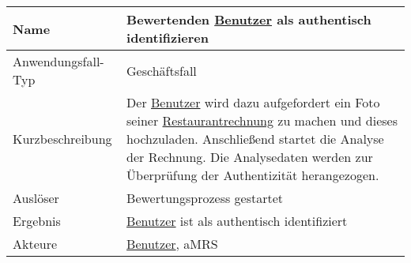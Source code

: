 \begin{table}[H]
    \centering
    \label{}
    \begin{tabularx}{\textwidth}{| l | X |}
        \hline
        Name               & Bewertenden \hyperref[gls:nutzer]{Benutzer} als authentisch identifizieren                                                                                                                                                                                                                \\
        \hline
        Anwendungsfall-Typ & Geschäftsfall                                                                                                                                                                                                                                                                             \\
        \hline
        Kurzbeschreibung   & Der \hyperref[gls:nutzer]{Benutzer} wird dazu aufgefordert ein Foto seiner \hyperref[gls:restaurantRechnung]{Restaurantrechnung} zu machen und dieses hochzuladen. Anschließend startet die Analyse der Rechnung. Die Analysedaten werden zur Überprüfung der Authentizität herangezogen. \\
        \hline
        Auslöser           & Bewertungsprozess gestartet                                                                                                                                                                                                                                                               \\
        \hline
        Ergebnis           & \hyperref[gls:nutzer]{Benutzer} ist als authentisch identifiziert                                                                                                                                                                                                                         \\
        \hline
        Akteure            & \hyperref[gls:nutzer]{Benutzer}, \ac{aMRS}                                                                                                                                                                                                                                                \\
        \hline
    \end{tabularx}
\end{table}

